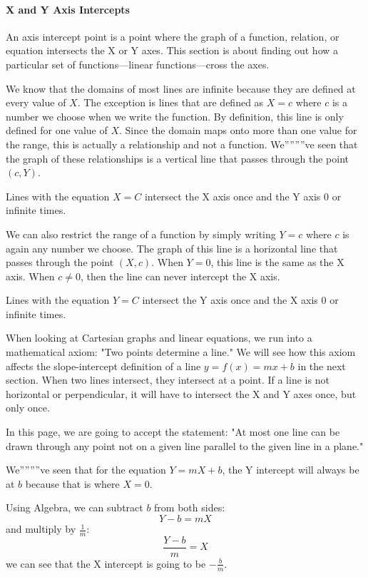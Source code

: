 \paragraph{X and Y Axis Intercepts}

An axis intercept point is a point where the graph of a function, relation, or equation intersects the X or Y axes. This section is about finding out how a particular set of functions—linear functions—cross the axes.

We know that the domains of most lines are infinite because they are defined at every value of $X$. The exception is lines that are defined as $X = c$ where $c$ is a number we choose when we write the function. By definition, this line is only defined for one value of $X$. Since the domain maps onto more than one value for the range, this is actually a relationship and not a function. We''''''''ve seen that the graph of these relationships is a vertical line that passes through the point $(c, Y)$.

Lines with the equation $X = C$ intersect the X axis once and the Y axis 0 or infinite times.

We can also restrict the range of a function by simply writing $Y = c$ where $c$ is again any number we choose. The graph of this line is a horizontal line that passes through the point $(X, c)$. When $Y = 0$, this line is the same as the X axis. When $c \neq 0$, then the line can never intercept the X axis.

Lines with the equation $Y = C$ intersect the Y axis once and the X axis 0 or infinite times.

When looking at Cartesian graphs and linear equations, we run into a mathematical axiom: "Two points determine a line." We will see how this axiom affects the slope-intercept definition of a line $y = f(x) = mx + b$ in the next section. When two lines intersect, they intersect at a point. If a line is not horizontal or perpendicular, it will have to intersect the X and Y axes once, but only once.

In this page, we are going to accept the statement: "At most one line can be drawn through any point not on a given line parallel to the given line in a plane."

We''''''''ve seen that for the equation $Y = mX + b$, the Y intercept will always be at $b$ because that is where $X = 0$.

Using Algebra, we can subtract $b$ from both sides:
$$
Y - b = mX
$$
and multiply by $\frac{1}{m}$:
$$
\frac{Y - b}{m} = X
$$
we can see that the X intercept is going to be $-\frac{b}{m}$.

